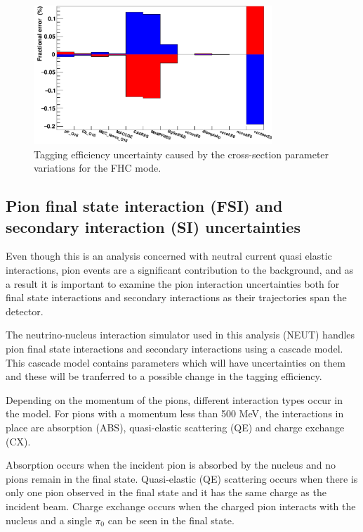 \begin{figure}[!htb]
\centering
\includegraphics[width=0.8\textwidth]{Figures/xsec_uncertainty.png}
\caption{Tagging efficiency uncertainty caused by the cross-section parameter variations for the FHC mode.}
\label{fig:xsecuncertainty}
\end{figure}

\subsection{Pion final state interaction (FSI) and secondary interaction (SI) uncertainties}

Even though this is an analysis concerned with neutral current quasi elastic interactions, pion events are a significant contribution to the background, and as a result it is important to examine the pion interaction uncertainties both for final state interactions and secondary interactions as their trajectories span the detector. 
\newline


The neutrino-nucleus interaction simulator used in this analysis (NEUT) handles pion final state interactions and secondary interactions using a cascade model. This cascade model contains parameters which will have uncertainties on them and these will be tranferred to a possible change in the tagging efficiency.

Depending on the momentum of the pions, different interaction types occur in the model. For pions with a momentum less than 500 MeV, the interactions in place are absorption (ABS), quasi-elastic scattering (QE) and charge exchange (CX).

Absorption occurs when the incident pion is absorbed by the nucleus and no pions remain in the final state. Quasi-elastic (QE) scattering occurs when there is only one pion observed in the final state and it has the same charge as the incident beam. Charge exchange occurs when the charged pion interacts with the nucleus and a single $\pi_{0}$ can be seen in the final state.


